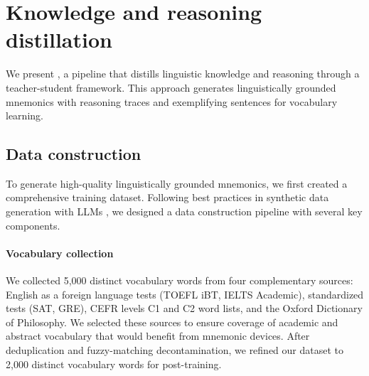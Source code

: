 
\section{Knowledge and reasoning distillation} \label{sec:distillation}


We present \links, a pipeline that distills linguistic knowledge and reasoning through a teacher-student framework. This approach generates linguistically grounded mnemonics with reasoning traces and exemplifying sentences for vocabulary learning.

\subsection{Data construction} \label{sec:data-gen}
To generate high-quality linguistically grounded mnemonics, we first created a comprehensive training dataset. Following best practices in synthetic data generation with LLMs \citetext{\citealp{longLLMsDrivenSyntheticData2024b}, \citealp{openthoughtsteamOpenThoughts2025}}, we designed a data construction pipeline with several key components.

\paragraph{Vocabulary collection} We collected 5,000 distinct vocabulary words from four complementary sources: English as a foreign language tests (TOEFL iBT, IELTS Academic), standardized tests (SAT, GRE), CEFR levels C1 and C2 word lists, and the Oxford Dictionary of Philosophy. We selected these sources to ensure coverage of academic and abstract vocabulary that would benefit from mnemonic devices. After deduplication and fuzzy-matching decontamination, we refined our dataset to 2,000 distinct vocabulary words for post-training.

